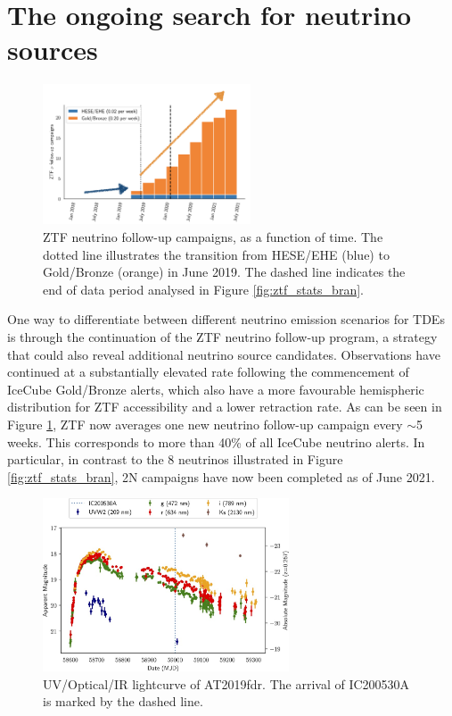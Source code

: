 \documentclass[a4paper,11pt]{article}
\begin{document}
\section{The ongoing search for neutrino sources}

\begin{figure}[!ht]
	\centering
	\includegraphics[width=0.55\textwidth]{figures/ztf_nu_rate}
	\caption{ZTF neutrino follow-up campaigns, as a function of time. The dotted line illustrates the transition from HESE/EHE (blue) to Gold/Bronze (orange) in June 2019. The dashed line indicates the end of data period analysed in Figure \ref{fig:ztf_stats_bran}.}
	\label{fig:ztf_nu_rate}
\end{figure}

One way to differentiate between different neutrino emission scenarios for TDEs is through the continuation of the ZTF neutrino follow-up program, a strategy that could also reveal additional neutrino source candidates. Observations have continued at a substantially elevated rate following the commencement of IceCube Gold/Bronze alerts, which also have a more favourable hemispheric distribution for ZTF accessibility and a lower retraction rate. As can be seen in Figure \ref{fig:ztf_nu_rate}, ZTF now averages one new neutrino follow-up campaign every $\sim$5 weeks. This corresponds to more than 40\% of all IceCube neutrino alerts. In particular, in contrast to the 8 neutrinos illustrated in Figure \ref{fig:ztf_stats_bran}, 2N campaigns have now been completed as of June 2021.

\begin{figure}[!ht]
	\centering
	\includegraphics[width=0.65\textwidth]{figures/at2019fdr_lightcurve}
	\caption{UV/Optical/IR lightcurve of AT2019fdr. The arrival of IC200530A is marked by the dashed line.}
	\label{fig:tywin_lightcurve}
\end{figure}
\end{document}
